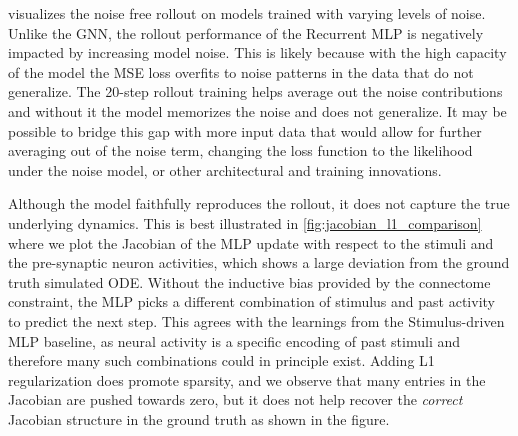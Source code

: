 \documentclass{article}
\def\stimbase{Stimulus-driven MLP}
\def\mlpbase{Recurrent MLP}
\begin{document}
 visualizes the noise free rollout on models trained with varying levels of noise. Unlike the GNN, the rollout performance of the \mlpbase{} is negatively impacted by increasing model noise. This is likely because with the high capacity of the model the MSE loss overfits to noise patterns in the data that do not generalize. The 20-step rollout training helps average out the noise contributions and without it the model memorizes the noise and does not generalize. It may be possible to bridge this gap with more input data that would allow for further averaging out of the noise term, changing the loss function to the likelihood under the noise model, or other architectural and training innovations. 

Although the model faithfully reproduces the rollout, it does not capture the true underlying dynamics. This is best illustrated in \cref{fig:jacobian_l1_comparison} where we plot the Jacobian of the MLP update with respect to the stimuli and the pre-synaptic neuron activities, which shows a large deviation from the ground truth simulated ODE. Without the inductive bias provided by the connectome constraint, the MLP picks a different combination of stimulus and past activity to predict the next step. This agrees with the learnings from the \stimbase{} baseline, as neural activity is a specific encoding of past stimuli and therefore many such combinations could in principle exist. Adding L1 regularization does promote sparsity, and we observe that many entries in the Jacobian are pushed towards zero, but it does not help recover the \emph{correct} Jacobian structure in the ground truth as shown in the figure.
\end{document}
